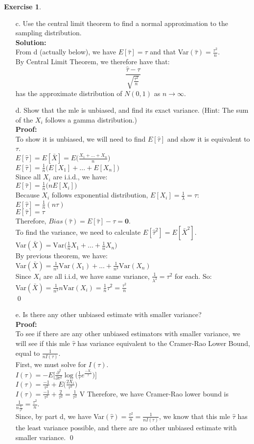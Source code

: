 \documentclass[11pt]{article}
\theoremstyle{definition}
\newtheorem{exercise}[theorem]{Exercise}
\newcommand{\V}{\vspace{0.3cm}\\}
\newcommand{\pro}{\V \textbf{Proof:} \V}
\newcommand{\sol}{\V \textbf{Solution:} \V}
\begin{document}
\begin{exercise}
\begin{enumerate}
Hence, we can see that $Y = kX \sim \Gamma(\alpha, k\beta)$ and have shown Lemma 2. \V
Therefore, the distribution of the mle $\hat{\tau} = \frac{\sum X_i}{n}$, which is the sum of $n$ $X_i's$ with distribution $\Gamma(1, \frac{1}{\tau})$ and scaled by $n$, must be $$\Gamma(n(1), \frac{1}{\tau}n) = \Gamma(n , \frac{n}{\tau})$$ \qed  \newpage
\item[c.] Use the central limit theorem to find a normal approximation to the sampling distribution. \sol
From d (actually below), we have $E[\hat{\tau}] = \tau$ and that Var$(\hat{\tau}) = \frac{\tau^2}{n}$. \V
By Central Limit Theorem, we therefore have that: 
$$\frac{\hat{\tau} - \tau}{\sqrt{\frac{\tau^2}{n}}} $$
has the approximate distribution of $N(0,1)$ as $n \to \infty$.
\item[d.] Show that the mle is unbiased, and find its exact variance. (Hint: The sum of the $X_i$ follows a gamma distribution.) \pro
To show it is unbiased, we will need to find $E[\hat{\tau}]$ and show it is equivalent to $\tau$. \V
$E[\hat{\tau}] = E[\bar{X}] = E\bigg(\frac{X_1 + ... + X_n}{n} \bigg)$ \V
$E[\hat{\tau}] = \frac{1}{n} \bigg(E[X_1] + ... + E[X_n] \bigg)$ \V
Since all $X_i$ are i.i.d., we have:\\
$E[\hat{\tau}] = \frac{1}{n} \bigg(nE[X_i]\bigg)$ \V
Because $X_i$ follows exponential distribution, $E[X_i] = \frac{1}{\lambda} = \tau$:\\
$E[\hat{\tau}] = \frac{1}{n} (n\tau)$ \V
$E[\hat{\tau}] = \tau$ \V
Therefore, $Bias(\hat{\tau}) = E[\hat{\tau}] - \tau = \textbf{0}$. \V
To find the variance, we need to calculate $E[\hat{\tau}^2] = E[\bar{X}^2]$. \V
Var$(\bar{X}) = \text{Var}\bigg(\frac{1}{n}X_1 + ... + \frac{1}{n}X_n \bigg)$ \V
By previous theorem, we have: \\
Var$(\bar{X}) = \frac{1}{n^2}\text{Var}(X_1) + ... + \frac{1}{n^2}\text{Var}(X_n)$ \V
Since $X_i$ are all i.i.d, we have same variance, $\frac{1}{\lambda^2} = \tau^2$ for each. So:\V
 Var$\displaystyle (\bar{X}) = \frac{1}{n^2} n \text{Var}(X_i)= \frac{1}{n} \tau^2 = \frac{\tau^2}{n}$ \V \qed \newpage

\item[e.] Is there any other unbiased estimate with smaller variance? \pro
To see if there are any other unbiased estimators with smaller variance, we will see if this mle $\hat{\tau}$ has variance equivalent to the Cramer-Rao Lower Bound, equal to $\frac{1}{nI(\tau)}$. \V
First, we must solve for $I(\tau)$. \\
$I(\tau) = -E\bigg[\frac{\partial^2}{\partial \tau^2} \log\big(\frac{1}{\tau}e^{\frac{-X_i}{\tau}} \big) \bigg]$\V
$I(\tau) = \frac{-1}{\tau^2} + E\Big(\frac{2X_i}{\tau^3} \Big)$ \V
$I(\tau) = \frac{-1}{\tau^2} + \frac{2}{\tau^2} = \frac{1}{\tau^2}$ V
Therefore, we have Cramer-Rao lower bound is $\frac{1}{n \frac{1}{\tau^2}} = \frac{\tau^2}{n}$. \V
Since, by part d, we have Var$(\hat{\tau}) = \frac{\tau^2}{n} = \frac{1}{nI(\tau)}$, we know that this mle $\hat{\tau}$ has the least variance possible, and there are no other unbiased estimate with smaller variance. \qed

\end{enumerate}
\end{exercise}
\end{document}
